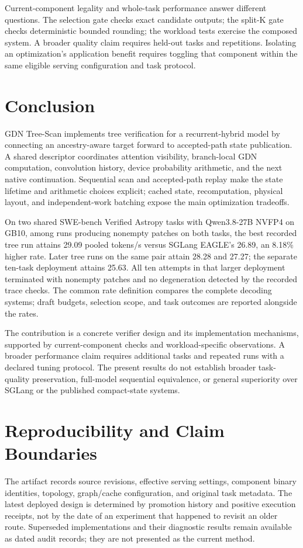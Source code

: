 \documentclass[conference]{IEEEtran}
\newcommand{\sys}{GDN Tree-Scan}
\begin{document}
Current-component legality and whole-task performance answer different questions. The selection gate checks exact candidate outputs; the split-K gate checks deterministic bounded rounding; the workload tests exercise the composed system. A broader quality claim requires held-out tasks and repetitions. Isolating an optimization's application benefit requires toggling that component within the same eligible serving configuration and task protocol.

\section{Conclusion}
\sys{} implements tree verification for a recurrent-hybrid model by connecting an ancestry-aware target forward to accepted-path state publication. A shared descriptor coordinates attention visibility, branch-local GDN computation, convolution history, device probability arithmetic, and the next native continuation. Sequential scan and accepted-path replay make the state lifetime and arithmetic choices explicit; cached state, recomputation, physical layout, and independent-work batching expose the main optimization tradeoffs.

On two shared SWE-bench Verified Astropy tasks with Qwen3.8-27B NVFP4 on GB10, among runs producing nonempty patches on both tasks, the best recorded tree run attains 29.09 pooled tokens/s versus SGLang EAGLE's 26.89, an 8.18\% higher rate. Later tree runs on the same pair attain 28.28 and 27.27; the separate ten-task deployment attains 25.63. All ten attempts in that larger deployment terminated with nonempty patches and no degeneration detected by the recorded trace checks. The common rate definition compares the complete decoding systems; draft budgets, selection scope, and task outcomes are reported alongside the rates.

The contribution is a concrete verifier design and its implementation mechanisms, supported by current-component checks and workload-specific observations. A broader performance claim requires additional tasks and repeated runs with a declared tuning protocol. The present results do not establish broader task-quality preservation, full-model sequential equivalence, or general superiority over SGLang or the published compact-state systems.

\appendices
\section{Reproducibility and Claim Boundaries}
\label{app:audit}
The artifact records source revisions, effective serving settings, component binary identities, topology, graph/cache configuration, and original task metadata. The latest deployed design is determined by promotion history and positive execution receipts, not by the date of an experiment that happened to revisit an older route. Superseded implementations and their diagnostic results remain available as dated audit records; they are not presented as the current method.
\end{document}
